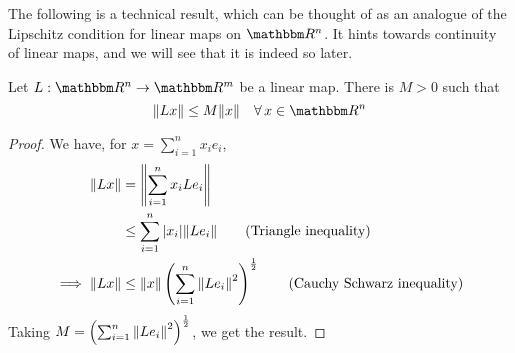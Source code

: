 \documentclass[../Analysis-3]{subfiles}
\begin{document}
The following is a technical result, which can be thought of as an analogue of the Lipschitz condition for linear maps on $ \R^n $. It hints towards continuity of linear maps, and we will see that it is indeed so later.
\ssk

\begin{Thm}{}{}
      Let $ L: \R^n \to \R^m $ be a linear map. There is $ M > 0 $ such that
      \[ \norm{Lx} \leq M \norm{x} \quad \forall \, x \in \R^n \]
\end{Thm}
\begin{proof}
      We have, for $ x = \sum_{i=1}^{n}x_ie_i $,
      \begin{align*}
            \norm{Lx}          & = \norm{\sum_{i=1}^{n} x_i Le_i}                                                                  \\
                               & \leq \sum_{i=1}^{n} |x_i| \norm{Le_i} \tag{Triangle inequality}                                   \\
            \implies \norm{Lx} & \leq \norm{x} \left(\sum_{i=1}^{n}\norm{Le_i}^2\right)^{\frac 12} \tag{Cauchy Schwarz inequality}
      \end{align*}
      Taking $ M = \left(\sum_{i=1}^{n}\norm{Le_i}^2\right)^{\frac 12} $, we get the result.
\end{proof}
\end{document}
